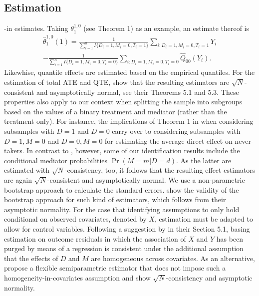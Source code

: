 \documentclass[a4paper,12pt]{article}
\begin{document}
 \doublespacing \pagestyle{plain}
\subsection{Estimation}
-in estimates. Taking $\theta_1^{1,0}$ (see Theorem 1) as an example, an estimate thereof is
 \begin{eqnarray*}
\hat{\theta}_1^{1,0}(1)=\frac{1}{\sum_{i=1}^{n}I\{D_i=1,M_i=0,T_i=1\}}\sum_{i:D_i=1,M_i=0,T_i=1}Y_i\\ -\frac{1}{\sum_{i=1}^{n}I\{D_i=1,M_i=0,T_i=0\}}\sum_{i:D_i=1,M_i=0,T_i=0}\hat{Q}_{00}(Y_i).
 \end{eqnarray*}
Likewhise, quantile effects are estimated based on the empirical quantiles.
For the estimation of total ATE and QTE,  show that the resulting estimators are $\sqrt{N}$-consistent and asymptotically normal, see their Theorems 5.1 and 5.3. These properties also apply to our context when splitting the sample into subgroups based on the values of a binary treatment and mediator (rather than the treatment only). For instance, the implications of Theorem 1 in  when considering subsamples with $D=1$ and $D=0$ carry over to considering subsamples with $D=1, M=0$ and $D=0, M=0$ for estimating the average direct effect on never-takers. In contrast to , however, some of our identification results include the conditional mediator probabilities $\Pr(M=m|D=d)$. As the latter are estimated with $\sqrt{N}$-consistency, too, it follows that the resulting effect estimators are again $\sqrt{N}$-consistent and asymptotically normal. %
We use a non-parametric bootstrap approach to calculate the standard errors.  show the validity of the bootstrap approach for such kind of estimators, which follows from their asymptotic normality.
For the case that identifying assumptions to only hold conditional on observed covariates, denoted by $X$, estimation must be adapted to allow for control variables. Following a suggestion by  in their Section 5.1, basing estimation on outcome residuals in which the association of $X$ and $Y$ has been purged by means of a regression is consistent under the additional assumption that the effects of $D$ and $M$ are homogeneous across covariates. As an alternative,  propose a flexible semiparametric estimator that does not impose such a homogeneity-in-covariates assumption and show $\sqrt{N}$-consistency and asymptotic normality.
\end{document}
